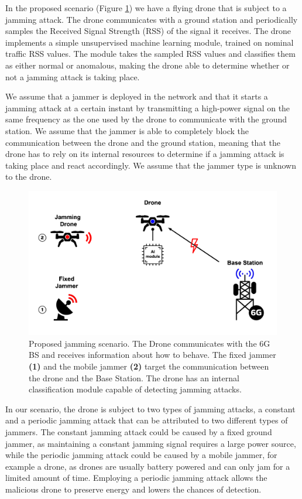\documentclass[futureinternet,article,submit,pdftex,moreauthors]{Definitions/mdpi}
\begin{document}
In the proposed scenario (Figure \ref{fig:CombinedJammingscenariosDiagram}) we have a flying drone that is subject to a jamming attack. The drone communicates with a ground station and periodically samples the Received Signal Strength (RSS) of the signal it receives. 
The drone implements a simple unsupervised machine learning module, trained on nominal traffic RSS values. The module takes the sampled RSS values and classifies them as either normal or anomalous, making the drone able to determine whether or not a jamming attack is taking place. 


We assume that a jammer is deployed in the network and that it starts a jamming attack at a certain instant by transmitting a high-power signal on the same frequency as the one used by the drone to communicate with the ground station.
We assume that the jammer is able to completely block the communication between the drone and the ground station, meaning that the drone has to rely on its internal resources to determine if a jamming attack is taking place and react accordingly.
We assume that the jammer type is unknown to the drone. 


\begin{figure}[H]
	\includegraphics[width=10.5 cm]{img/CombinedJammingscenariosDiagram.jpg}
	\centering
	\caption{Proposed jamming scenario. The Drone communicates with the 6G BS and receives information about how to behave. The fixed jammer \textbf{(1)} and the mobile jammer \textbf{(2)} target the communication between the drone and the Base Station. The drone has an internal classification module capable of detecting jamming attacks.}
	\label{fig:CombinedJammingscenariosDiagram}
	\end{figure}   


In our scenario, the drone is subject to two types of jamming attacks, a constant and a periodic jamming attack that can be attributed to two different types of jammers. The constant jamming attack could be caused by a fixed ground jammer, as maintaining a constant jamming signal requires a large power source, while 
the periodic jamming attack could be caused by a mobile jammer, for example a drone, as drones are usually battery powered and can only jam for a limited amount of time. 
Employing a periodic jamming attack allows the malicious drone to preserve energy and lowers the chances of detection.
\end{document}
